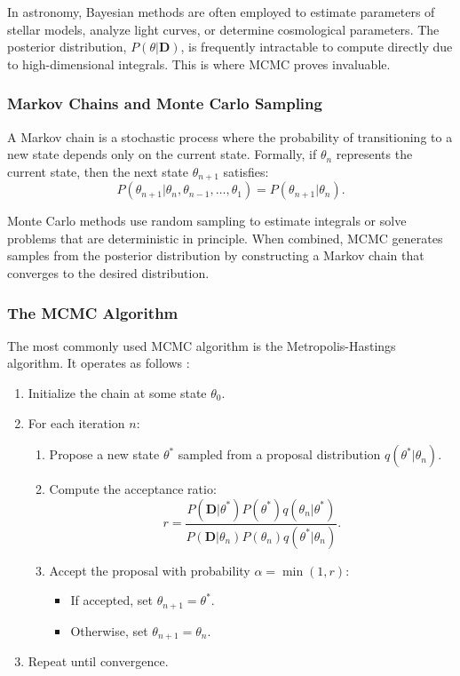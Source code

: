 \documentclass[12pt]{article}
\begin{document}
In astronomy, Bayesian methods are often employed to estimate parameters of stellar models, analyze light curves, or determine cosmological parameters. The posterior distribution, $P(\theta | \mathbf{D})$, is frequently intractable to compute directly due to high-dimensional integrals. This is where MCMC proves invaluable.

\subsubsection*{Markov Chains and Monte Carlo Sampling}
A Markov chain is a stochastic process where the probability of transitioning to a new state depends only on the current state. Formally, if $\theta_n$ represents the current state, then the next state $\theta_{n+1}$ satisfies:
\begin{equation}
    P(\theta_{n+1} | \theta_n, \theta_{n-1}, \dots, \theta_1) = P(\theta_{n+1} | \theta_n).
\end{equation}

Monte Carlo methods use random sampling to estimate integrals or solve problems that are deterministic in principle. When combined, MCMC generates samples from the posterior distribution by constructing a Markov chain that converges to the desired distribution.

\subsubsection*{The MCMC Algorithm}
The most commonly used MCMC algorithm is the Metropolis-Hastings algorithm. It operates as follows \cite{2015arXiv150401896R}:
\begin{enumerate}
    \item Initialize the chain at some state $\theta_0$.
    \item For each iteration $n$:
    \begin{enumerate}
        \item Propose a new state $\theta^*$ sampled from a proposal distribution $q(\theta^* | \theta_n)$.
        \item Compute the acceptance ratio:
        \begin{equation}
            r = \frac{P(\mathbf{D} | \theta^*) P(\theta^*) q(\theta_n | \theta^*)}{P(\mathbf{D} | \theta_n) P(\theta_n) q(\theta^* | \theta_n)}.
        \end{equation}
        \item Accept the proposal with probability $\alpha = \min(1, r)$:
        \begin{itemize}
            \item If accepted, set $\theta_{n+1} = \theta^*$.
            \item Otherwise, set $\theta_{n+1} = \theta_n$.
        \end{itemize}
    \end{enumerate}
    \item Repeat until convergence.
\end{enumerate}
\end{document}

